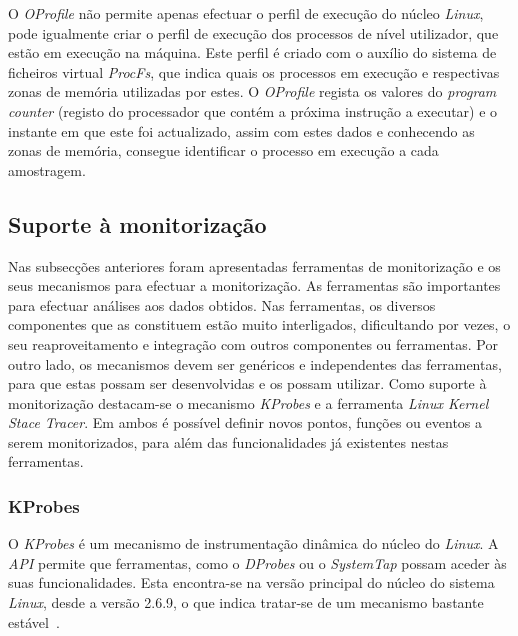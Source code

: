 O \textit{OProfile} não permite apenas efectuar o perfil de execução do núcleo \textit{Linux}, pode igualmente criar o perfil de execução dos processos de nível utilizador, que estão em execução na máquina.
Este perfil é criado com o auxílio do sistema de ficheiros virtual \textit{ProcFs}, que indica quais os processos em execução e respectivas zonas de memória utilizadas por estes.
O \textit{OProfile} regista os valores do \textit{program counter} (registo do processador que contém a próxima instrução a executar) e o instante em que este foi actualizado, assim com estes dados e conhecendo as zonas de memória, consegue identificar o processo em execução a cada amostragem.



\subsection{Suporte à monitorização}

Nas subsecções anteriores foram apresentadas ferramentas de monitorização e os seus mecanismos para efectuar a monitorização.
As ferramentas são importantes para efectuar análises aos dados obtidos.
Nas ferramentas, os diversos componentes que as constituem estão muito interligados, dificultando por vezes, o seu reaproveitamento e integração com outros componentes ou ferramentas.
Por outro lado, os mecanismos devem ser genéricos e independentes das ferramentas, para que estas possam ser desenvolvidas e os possam utilizar.
Como suporte à monitorização destacam-se o mecanismo \textit{KProbes} e a ferramenta \textit{Linux Kernel Stace Tracer}.
Em ambos é possível definir novos pontos, funções ou eventos a serem monitorizados, para além das funcionalidades já existentes nestas ferramentas.

\subsubsection{KProbes}\label{sect:KProbes_overview}

O \textit{KProbes} é um mecanismo de instrumentação dinâmica do núcleo do \textit{Linux}.
A \textit{API} permite que ferramentas, como o \textit{DProbes} ou o \textit{SystemTap} possam aceder às suas funcionalidades.
Esta encontra-se na versão principal do núcleo do sistema \textit{Linux}, desde a versão 2.6.9, o que indica tratar-se de um mecanismo bastante estável~\cite{kernel_debug_printk_on_fly,KProbesSite}.

